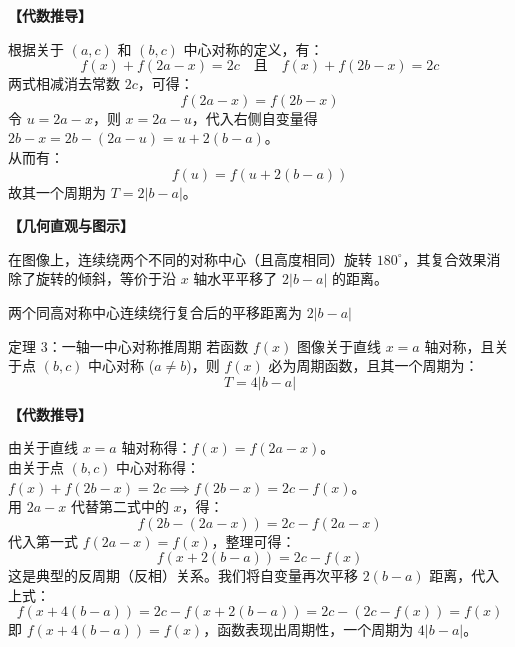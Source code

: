 \documentclass[11pt,a4paper]{ctexart}
\newcommand{\topicteachblock}[2]{%
  \par\addvspace{0.55em}%
  \noindent\textbf{【#1】}\par\nobreak
  \begingroup
    \setlength{\parskip}{0.35em}%
    #2\par
  \endgroup
}
\begin{document}
\topicteachblock{代数推导}{
  根据关于 $(a, c)$ 和 $(b, c)$ 中心对称的定义，有：
  \[ f(x) + f(2a-x) = 2c \quad \text{且} \quad f(x) + f(2b-x) = 2c \]
  两式相减消去常数 $2c$，可得：
  \[ f(2a-x) = f(2b-x) \]
  令 $u = 2a-x$，则 $x = 2a-u$，代入右侧自变量得 $2b-x = 2b-(2a-u) = u + 2(b-a)$。\\
  从而有：
  \[ f(u) = f(u + 2(b-a)) \]
  故其一个周期为 $T = 2|b-a|$。
}

\topicteachblock{几何直观与图示}{
  在图像上，连续绕两个不同的对称中心（且高度相同）旋转 $180^\circ$，其复合效果消除了旋转的倾斜，等价于沿 $x$ 轴水平平移了 $2|b-a|$ 的距离。
}

\begin{center}
  \par
  \small 两个同高对称中心连续绕行复合后的平移距离为 $2|b-a|$
\end{center}

\newpage

\begin{theorembox}{定理 3：一轴一中心对称推周期}
  若函数 $f(x)$ 图像关于直线 $x = a$ 轴对称，且关于点 $(b, c)$ 中心对称 ($a \neq b$)，则 $f(x)$ 必为周期函数，且其一个周期为：
  \[ T = 4|b-a| \]
\end{theorembox}

\topicteachblock{代数推导}{
  由关于直线 $x=a$ 轴对称得：$f(x) = f(2a-x)$。\\
  由关于点 $(b, c)$ 中心对称得：$f(x) + f(2b-x) = 2c \implies f(2b-x) = 2c - f(x)$。\\
  用 $2a-x$ 代替第二式中的 $x$，得：
  \[ f(2b-(2a-x)) = 2c - f(2a-x) \]
  代入第一式 $f(2a-x) = f(x)$，整理可得：
  \[ f(x + 2(b-a)) = 2c - f(x) \]
  这是典型的反周期（反相）关系。我们将自变量再次平移 $2(b-a)$ 距离，代入上式：
  \[ f(x + 4(b-a)) = 2c - f(x + 2(b-a)) = 2c - (2c - f(x)) = f(x) \]
  即 $f(x + 4(b-a)) = f(x)$，函数表现出周期性，一个周期为 $4|b-a|$。
}
\end{document}

